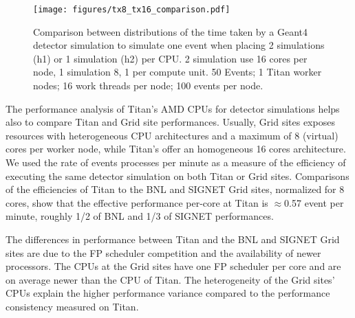 \begin{figure}[htp]
    \texttt{[image: figures/tx8\_tx16\_comparison.pdf]}
    \caption{Comparison between distributions of the time taken by a Geant4
    detector simulation to simulate one event when placing 2 simulations (h1) or
    1 simulation (h2) per CPU. 2 simulation use 16 cores per node, 1 simulation
    8, 1 per compute unit. 50 Events; 1 Titan worker nodes; 16 work threads per
    node; 100 events per node.}
\label{fig:comparison-8-16cores}
\end{figure}

The performance analysis of Titan's AMD CPUs for detector simulations helps also
to compare Titan and Grid site performances. Usually, Grid sites exposes
resources with heterogeneous CPU architectures and a maximum of 8 (virtual)
cores per worker node, while Titan's offer an homogeneous 16 cores architecture.
We used the rate of events processes per minute as a measure of the efficiency
of executing the same detector simulation on both Titan or Grid sites.
Comparisons of the efficiencies of Titan to  the BNL and SIGNET Grid sites,
normalized for 8 cores, show that the effective performance per-core at Titan is
$\approx$0.57 event per minute, roughly 1/2 of BNL and  1/3 of SIGNET
performances.


The differences in performance between Titan and the BNL and SIGNET Grid sites
are due to the FP scheduler competition and the availability of newer
processors. The CPUs at the Grid sites have one FP scheduler per core and are on
average newer than the CPU of Titan. The heterogeneity of the Grid sites' CPUs
explain the higher performance variance compared to the performance consistency
measured on Titan.

